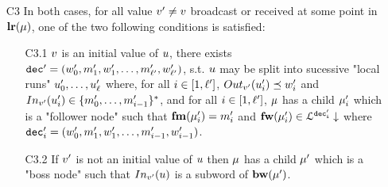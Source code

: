 \begin{definition}
\begin{itemize}
		\item[C3\namedlabel{unfoldingC3}{C3}] In both cases, for all value $v' \neq v$ broadcast or received at some point in $\mathbf{lr}(\mu)$, one of the two following conditions is satisfied:
		\begin{itemize}
			\item[C3.1\namedlabel{unfoldingC3.1}{C3.1}]
			 $v$ is an initial value of $u$, 
			there exists $\mathtt{dec}' = (w'_0, m'_1, w'_1, \ldots, m'_{\ell'}, w'_{\ell'})$, s.t. $u$ may be split into sucessive "local runs" $u'_0, \dots, u'_{\ell}$ where, for all $i \in [1,\ell']$, $\voutput{\aval'}{\localrun'_i} \subword w'_i$ and $\vinput{\aval'}{\localrun'_i} \in \set{m'_0, \dots, m'_{i-1}}^*$, and
			for all $i \in[1,\ell']$, $\mu$ has a child $\mu'_i$ which is a "follower node" such that $\mathbf{fm}(\mu'_i) = m'_i$ and $\mathbf{fw}(\mu'_i) \in\mathcal{L}^{\mathtt{\mathtt{dec}'_i}}\downarrow$ where $\mathtt{dec}'_i = (w'_0, m'_1, w'_1, \ldots, m'_{i-1}, w'_{i-1})$.
			
			\item[C3.2\namedlabel{unfoldingC3.2}{C3.2}] If $v'$ is not an initial value of $u$ then $\mu$ has a child $\mu'$ which is a "boss node" such that $\vinput{\aval'}{\localrun}$ is a subword of $\mathbf{bw}(\mu')$.
		\end{itemize}
	\end{itemize}
	
	
\end{definition}


